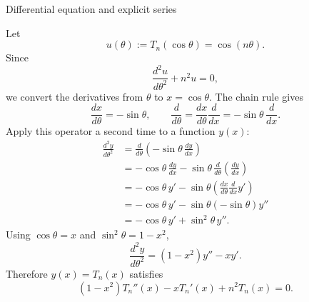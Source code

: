 \documentclass[11pt]{beamer}
\begin{document}
\begin{frame}[allowframebreaks]{Differential equation and explicit series}
\footnotesize

Let
\[
  u(\theta):=T_n(\cos\theta)=\cos(n\theta).
\]
Since
\[
  \frac{d^2u}{d\theta^2}+n^2u=0,
\]
we convert the derivatives from $\theta$ to $x=\cos\theta$.  The chain rule gives
\[
  \frac{dx}{d\theta}=-\sin\theta,
  \qquad
  \frac{d}{d\theta}
    =\frac{dx}{d\theta}\frac{d}{dx}
    =-\sin\theta\,\frac{d}{dx}.
\]
Apply this operator a second time to a function $y(x)$:
\begin{align*}
  \frac{d^2y}{d\theta^2}
   &=
    \frac{d}{d\theta}
      \left(-\sin\theta\,\frac{dy}{dx}\right)\\
   &=
    -\cos\theta\,\frac{dy}{dx}
    -\sin\theta\,
      \frac{d}{d\theta}\left(\frac{dy}{dx}\right)\\
   &=
    -\cos\theta\,y'
    -\sin\theta
      \left(
        \frac{dx}{d\theta}\frac{d}{dx}y'
      \right)\\
   &=
    -\cos\theta\,y'
    -\sin\theta(-\sin\theta)y''\\
   &=
    -\cos\theta\,y'
    +\sin^2\theta\,y''.
\end{align*}
Using $\cos\theta=x$ and $\sin^2\theta=1-x^2$,
\[
  \frac{d^2y}{d\theta^2}
    =(1-x^2)y''-xy'.
\]
Therefore $y(x)=T_n(x)$ satisfies
\begin{equation}
  (1-x^2)T_n''(x)-xT_n'(x)+n^2T_n(x)=0.
  \label{eq:cheby-eq}
\end{equation}


\end{frame}
\end{document}
